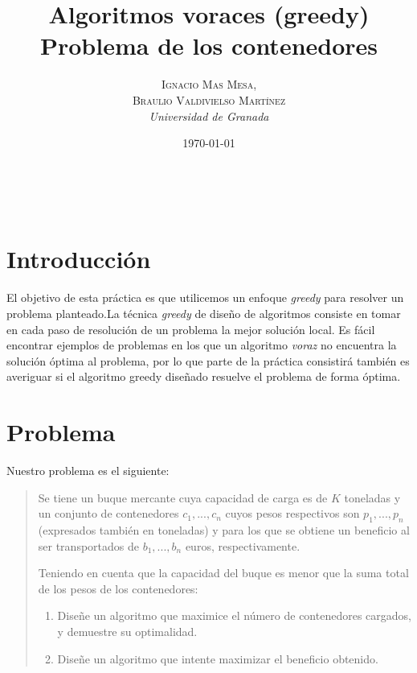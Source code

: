 \documentclass[a4paper, 11pt]{article}
\title{\textbf{Algoritmos voraces (greedy)}\\ %
Problema de los contenedores} %
\author{\textsc{Ignacio Mas Mesa,\\Braulio Valdivielso Martínez} %
\\{\textit{Universidad de Granada}}} %
\date{\today} %
\makeatletter
\renewcommand{\maketitle}{
  \begin{flushright} %
  
  {\LARGE\@title} %
  
  \vspace{50pt} %
  
  {\large\@author} %
  \\\@date %
  \vspace{40pt} %
  \end{flushright}
}
\makeatother
\begin{document}
\maketitle %

\renewcommand{\abstractname}{Resumen} %



  \tableofcontents

\pagebreak


\section{Introducción}
El objetivo de esta práctica es que utilicemos un enfoque \textit{greedy} para resolver un problema planteado.La técnica \textit{greedy} de diseño de algoritmos consiste en tomar en cada paso de resolución de un problema la mejor solución local. Es fácil encontrar ejemplos de problemas en los que un algoritmo \textit{voraz} no encuentra la solución óptima al problema, por lo que parte de la práctica consistirá también es averiguar si el algoritmo greedy diseñado resuelve el problema de forma óptima.

\section{Problema}
Nuestro problema es el siguiente:
\begin{quote}
Se tiene un buque mercante cuya capacidad de carga es de $K$ toneladas y un conjunto de
contenedores $c_1, . . . , c_n$ cuyos pesos respectivos son $p_1, . . . , p_n$ (expresados también en toneladas) y para los que se obtiene un beneficio al ser transportados de $b_1, . . . , b_n$ euros, respectivamente.

Teniendo en cuenta que la capacidad del buque es menor que la suma total de los pesos de los
contenedores:
\begin{enumerate}
\item Diseñe un algoritmo que maximice el número de contenedores cargados, y demuestre su
optimalidad.
\item Diseñe un algoritmo que intente maximizar el beneficio obtenido.
\end{enumerate}
\end{quote}
\end{document}
